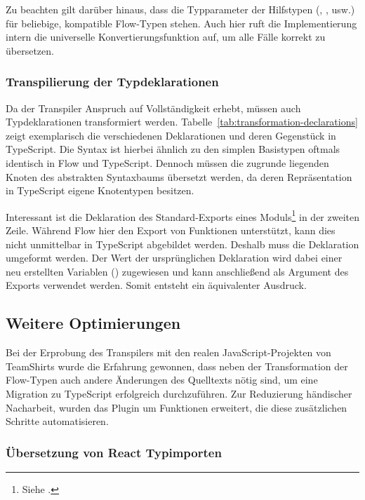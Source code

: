 Zu beachten gilt darüber hinaus, dass die Typparameter der Hilfstypen (, ,  usw.) für beliebige, kompatible Flow-Typen stehen. Auch hier ruft die Implementierung intern die universelle Konvertierungsfunktion  auf, um alle Fälle korrekt zu übersetzen.

\subsubsection{Transpilierung der Typdeklarationen}

Da der Transpiler Anspruch auf Vollständigkeit erhebt, müssen auch Typdeklarationen transformiert werden. Tabelle~\ref{tab:transformation-declarations} zeigt exemplarisch die verschiedenen Deklarationen und deren Gegenstück in TypeScript. Die Syntax ist hierbei ähnlich zu den simplen Basistypen oftmals identisch in Flow und TypeScript. Dennoch müssen die zugrunde liegenden Knoten des abstrakten Syntaxbaums übersetzt werden, da deren Repräsentation in TypeScript eigene Knotentypen besitzen.

Interessant ist die Deklaration des Standard-Exports eines Moduls\footnote{Siehe \autocite[377]{ECMASCRIPT:2019}.} in der zweiten Zeile. Während Flow hier den Export von Funktionen unterstützt, kann dies nicht unmittelbar in TypeScript abgebildet werden. Deshalb muss die Deklaration umgeformt werden. Der Wert der ursprünglichen Deklaration wird dabei einer neu erstellten Variablen () zugewiesen und kann anschließend als Argument des Exports verwendet werden. Somit entsteht ein äquivalenter Ausdruck.



\subsection{Weitere Optimierungen}
\label{sec:optimizations}

Bei der Erprobung des Transpilers mit den realen JavaScript-Projekten von TeamShirts wurde die Erfahrung gewonnen, dass neben der Transformation der Flow-Typen auch andere Änderungen des Quelltexts nötig sind, um eine Migration zu TypeScript erfolgreich durchzuführen. Zur Reduzierung händischer Nacharbeit, wurden das Plugin um Funktionen erweitert, die diese zusätzlichen Schritte automatisieren.

\subsubsection{Übersetzung von React Typimporten}
\label{sec:react-type-import-mapping}

